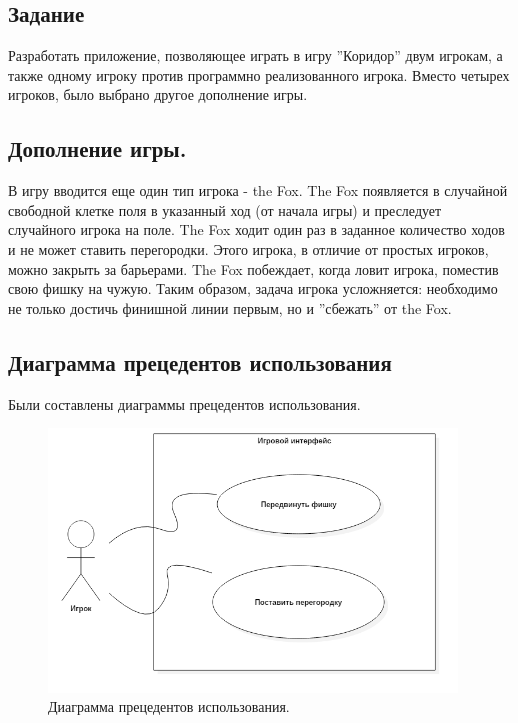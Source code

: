 \documentclass[a4paper]{article}
\begin{document}
\subsection{Задание}
Разработать приложение, позволяющее играть в игру ''Коридор'' двум игрокам, а также одному игроку против программно реализованного игрока. Вместо четырех игроков, было выбрано другое дополнение игры. 

\subsection{Дополнение игры.}
В игру вводится еще один тип игрока - the Fox. The Fox появляется в случайной свободной клетке поля в указанный ход (от начала игры) и преследует случайного игрока на поле. The Fox ходит один раз в заданное количество ходов и не может ставить перегородки. Этого игрока, в отличие от простых игроков, можно закрыть за барьерами. The Fox побеждает, когда ловит игрока, поместив свою фишку на чужую. Таким образом, задача игрока усложняется: необходимо не только достичь финишной линии первым, но и ''сбежать'' от the Fox.
\subsection{Диаграмма прецедентов использования}
Были составлены диаграммы прецедентов использования.
\begin{figure}[H]
	\begin{center}
		\includegraphics[scale=0.5, height=7cm]{../pictures/UseCaseDiagram1.png}
		\caption{Диаграмма прецедентов использования.} 
		\label{pic:UseCaseDiagram1} %
	\end{center}
\end{figure}
\end{document}
